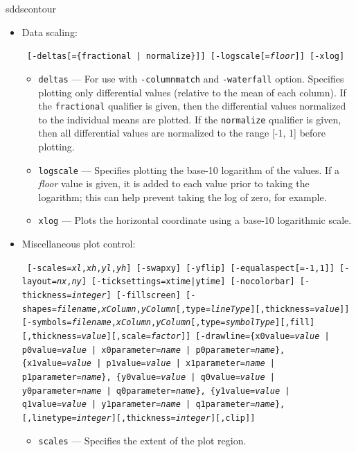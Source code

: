 \begin{sddsprog}{sddscontour}
\begin{itemize}
    \item Data scaling:
\begin{flushleft}{\tt
[-deltas[=\{fractional | normalize\}]] [-logscale[={\em floor}]] [-xlog]
}\end{flushleft}
        \begin{itemize}
        \item \verb|deltas| --- For use with \verb|-columnmatch| and \verb|-waterfall| option.  Specifies plotting
        only differential values (relative to the mean of each column).  If the \verb|fractional|
        qualifier is given, then the differential values normalized to the individual
        means are plotted.  If the \verb|normalize| qualifier is given, then all differential values
        are normalized to the range [-1, 1] before plotting.
        \item \verb|logscale| --- Specifies plotting the base-10 logarithm of the values.  If a
        {\em floor} value is given, it is added to each value prior to taking the logarithm; this
        can help prevent taking the log of zero, for example.
        \item \verb|xlog| --- Plots the horizontal coordinate using a base-10 logarithmic scale.
        \end{itemize}
    \item Miscellaneous plot control:
\begin{flushleft}{\tt
[-scales={\em xl},{\em xh},{\em yl},{\em yh}]
[-swapxy] [-yflip] [-equalaspect[={-1,1}]]
[-layout={\em nx},{\em ny}] [-ticksettings=xtime|ytime]
[-nocolorbar] [-thickness={\em integer}] [-fillscreen]
[-shapes={\em filename},{\em xColumn},{\em yColumn}[,type={\em lineType}][,thickness={\em value}]]
[-symbols={\em filename},{\em xColumn},{\em yColumn}[,type={\em symbolType}][,fill][,thickness={\em value}][,scale={\em factor}]]
[-drawline=\{x0value={\em value} | p0value={\em value} | x0parameter={\em name} | p0parameter={\em name}\},
            \{x1value={\em value} | p1value={\em value} | x1parameter={\em name} | p1parameter={\em name}\},
            \{y0value={\em value} | q0value={\em value} | y0parameter={\em name} | q0parameter={\em name}\},
            \{y1value={\em value} | q1value={\em value} | y1parameter={\em name} | q1parameter={\em name}\},
            [,linetype={\em integer}][,thickness={\em integer}][,clip]]
}\end{flushleft}
        \begin{itemize}
        \item \verb|scales| --- Specifies the extent of the plot region.

\end{itemize}
\end{itemize}
\end{sddsprog}
